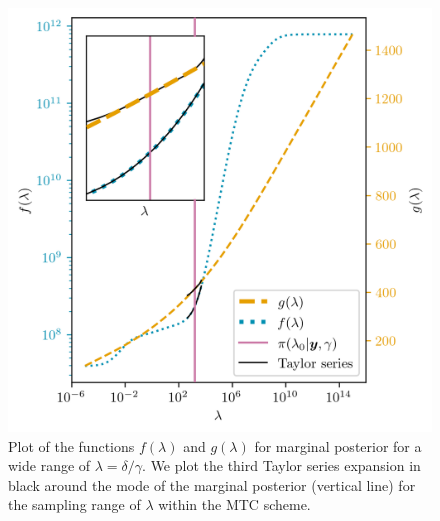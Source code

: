 \begin{figure}[ht!]
	\centering
	\includegraphics{f_and_g_phd.png}
	\caption[Plot of the functions $f(\lambda)$ and $g(\lambda)$ for marginal posterior.]{Plot of the functions $f(\lambda)$ and $g(\lambda)$ for marginal posterior for a wide range of $\lambda = \delta / \gamma$. We plot the third Taylor series expansion in black around the mode of the marginal posterior (vertical line) for the sampling range of $\lambda$ within the MTC scheme.}
	\label{fig:fandg}
\end{figure}


